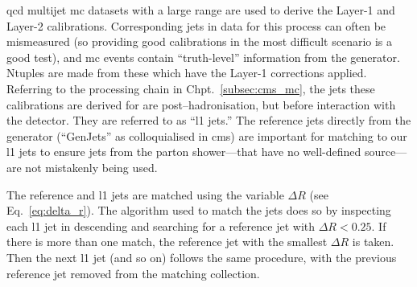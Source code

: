 \acrshort{qcd} multijet \acrshort{mc} datasets with a large \pt range are used to derive the Layer-1 and Layer-2 calibrations. Corresponding \glspl{jet} in data for this process can often be mismeasured (so providing good calibrations in the most difficult scenario is a good test), and \acrshort{mc} events contain ``truth-level'' information from the generator. Ntuples are made from these which have the Layer-1 corrections applied. Referring to the processing chain in Chpt.~\ref{subsec:cms_mc}, the \glspl{jet} these calibrations are derived for are post--hadronisation, but before interaction with the detector. They are referred to as ``\acrfull{l1} \glspl{jet}.'' The reference \glspl{jet} directly from the generator (``GenJets'' as colloquialised in \acrshort{cms}) are important for matching to our \acrshort{l1} \glspl{jet} to ensure \glspl{jet} from the parton shower---that have no well-defined source---are not mistakenly being used.

The reference and \acrshort{l1} \glspl{jet} are matched using the variable $\Delta R$ (see Eq.~\ref{eq:delta_r}). The algorithm used to match the \glspl{jet} does so by inspecting each \acrshort{l1} \gls{jet} in descending \pt and searching for a reference \gls{jet} with $\Delta R < \text{0.25}$. If there is more than one match, the reference \gls{jet} with the smallest $\Delta R$ is taken. Then the next \acrshort{l1} jet (and so on) follows the same procedure, with the previous reference \gls{jet} removed from the matching collection.

